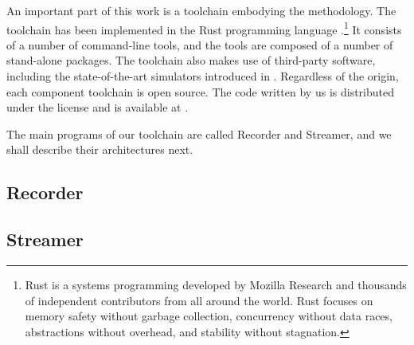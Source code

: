 An important part of this work is a toolchain embodying the methodology. The
toolchain has been implemented in the Rust programming language
\cite{rust}.\footnote{Rust is a systems programming developed by Mozilla
Research and thousands of independent contributors from all around the world.
Rust focuses on memory safety without garbage collection, concurrency without
data races, abstractions without overhead, and stability without stagnation.} It
consists of a number of command-line tools, and the tools are composed of a
number of stand-alone packages. The toolchain also makes use of third-party
software, including the state-of-the-art simulators introduced in
. Regardless of the origin, each component toolchain is open
source. The code written by us is distributed under the  license
\cite{mit} and is available at \cite{sources}.

The main programs of our toolchain are called Recorder and Streamer, and we
shall describe their architectures next.

\subsection{Recorder}


\subsection{Streamer}

